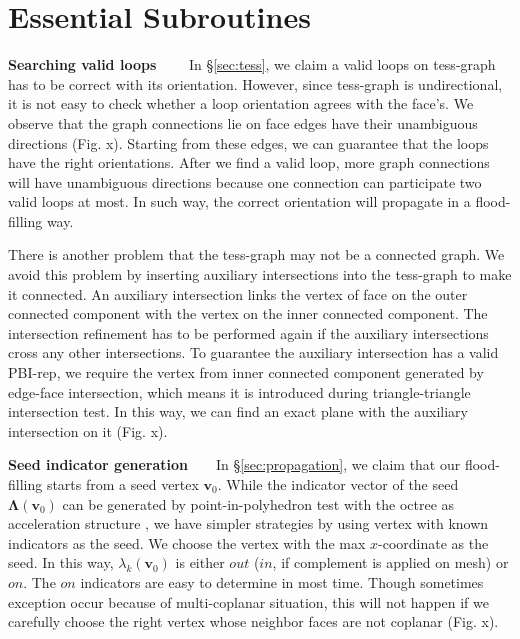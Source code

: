 \documentclass[10pt,journal,compsoc]{IEEEtran}
\begin{document}
\section{Essential Subroutines}
\label{sec:esubroutine}

\vspace{0.5em}
\noindent\textbf{Searching valid loops}~~~~ In \S\ref{sec:tess}, we claim a valid loops on tess-graph has to be correct with its orientation. However, since tess-graph is undirectional, it is not easy to check whether a loop orientation agrees with the face's. We observe that the graph connections lie on face edges have their unambiguous directions (Fig. x). Starting from these edges, we can guarantee that the loops have the right orientations. After we find a valid loop, more graph connections will have unambiguous directions because one connection can participate two valid loops at most. In such way, the correct orientation will propagate in a flood-filling way.


\vspace{0.5em}\noindent There is another problem that the tess-graph may not be a connected graph. We avoid this problem by inserting auxiliary intersections into the tess-graph to make it connected. An auxiliary intersection links the vertex of face on the outer connected component with the vertex on the inner connected component. The intersection refinement has to be performed again if the auxiliary intersections cross any other intersections. To guarantee the auxiliary intersection has a valid PBI-rep, we require the vertex from inner connected component generated by edge-face intersection, which means it is introduced during triangle-triangle intersection test. In this way, we can find an exact plane with the auxiliary intersection on it (Fig. x).

\vspace{0.5em}
\noindent\textbf{Seed indicator generation}~~~~In \S\ref{sec:propagation}, we claim that our flood-filling starts from a seed vertex $\bm{v}_0$. While the indicator vector of the seed $\bm{\Lambda}(\bm{v}_0)$ can be generated by point-in-polyhedron test \cite{ogayar2005point} with the octree as acceleration structure \cite{frisken2002simple}, we have simpler strategies by using vertex with known indicators as the seed. We choose the vertex with the max $x$-coordinate as the seed. In this way, $\lambda_k(\bm{v}_0)$ is either $out$ ($in$, if complement is applied on mesh) or $on$. The $on$ indicators are easy to determine in most time. Though sometimes exception occur because of multi-coplanar situation, this will not happen if we carefully choose the right vertex whose neighbor faces are not coplanar (Fig. x).
\end{document}
